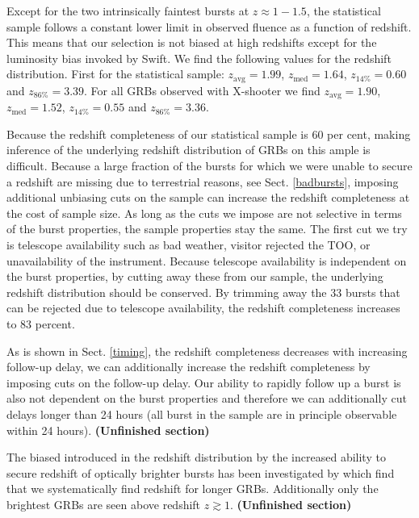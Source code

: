 \documentclass{aa}    %
\newcommand\todo[1]{\textbf{(#1)}}
\begin{document}
Except for the two intrinsically faintest bursts at $z\approx 1 - 1.5$, the
statistical sample follows a constant lower limit in observed fluence as a
function of redshift. This means that our selection is not biased at high
redshifts except for the luminosity bias invoked by Swift. We find the
following values for the redshift distribution. First for the statistical
sample: $z_{\mathrm{avg}}=1.99$, $z_{\mathrm{med}}=1.64$, $z_{14\%}=0.60$ and
$z_{86\%}=3.39$. For all GRBs observed with X-shooter we find
$z_{\mathrm{avg}}=1.90$, $z_{\mathrm{med}}=1.52$, $z_{14\%}=0.55$ and
$z_{86\%}=3.36$.



Because the redshift completeness of our statistical sample is 60 per cent,
making inference of the underlying redshift distribution of GRBs on this ample
is difficult. Because a large fraction of the bursts for which we were unable to
secure a redshift are missing due to terrestrial reasons, see Sect.
\ref{badbursts}, imposing additional unbiasing cuts on the sample can increase
the redshift completeness at the cost of sample size. As long as the cuts we
impose are not selective in terms of the burst properties, the sample properties
stay the same. The first cut we try is telescope availability such as bad
weather, visitor rejected the TOO, or unavailability of the instrument. Because
telescope availability is independent on the burst properties, by cutting away
these from our sample, the underlying redshift distribution should be conserved.
By trimming away the 33 bursts that can be rejected due to
telescope availability, the redshift completeness increases to 83 percent.

As is shown in Sect. \ref{timing}, the redshift completeness
decreases with increasing follow-up delay, we can additionally increase the
redshift completeness by imposing cuts on the follow-up delay. Our ability to
rapidly follow up a burst is also not dependent on the burst properties and
therefore we can additionally cut delays longer than 24 hours (all burst in the
sample are in principle observable within 24 hours). \todo{Unfinished section}


The biased introduced in the redshift distribution by the increased ability to
secure redshift of optically brighter bursts has been investigated by
\citet{Turpin2016} which find that we systematically find redshift for longer
GRBs. Additionally only the brightest GRBs are seen above redshift $z \gtrsim
1$. \todo{Unfinished section}
\end{document}
